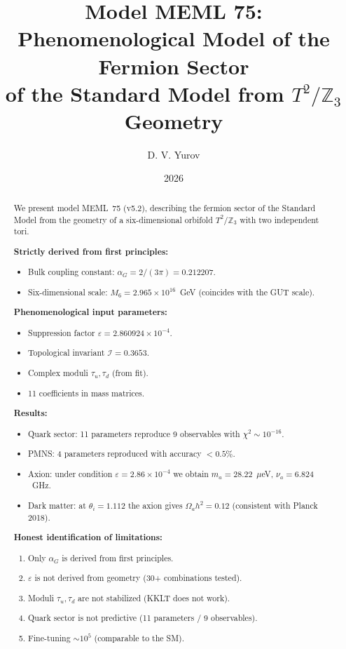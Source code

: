 \documentclass[12pt,a4paper]{article}
\title{%
    \textbf{Model MEML 75:} \\[0.3cm]
    \large Phenomenological Model of the Fermion Sector \\
    of the Standard Model from $T^2/\mathbb{Z}_3$ Geometry%
}
\author{D. V. Yurov}
\date{2026}
\numberwithin{equation}{section}
\begin{document}
\maketitle

\begin{abstract}
We present model MEML~75 (v5.2), describing the fermion sector
of the Standard Model from the geometry of a six-dimensional
orbifold $T^2/\mathbb{Z}_3$ with two independent tori.

\textbf{Strictly derived from first principles:}
\begin{itemize}[leftmargin=1.5em,itemsep=0.05em]
\item Bulk coupling constant: $\alpha_G = 2/(3\pi) = 0.212207$.
\item Six-dimensional scale: $M_6 = 2.965\times 10^{16}$~GeV
(coincides with the GUT scale).
\end{itemize}

\textbf{Phenomenological input parameters:}
\begin{itemize}[leftmargin=1.5em,itemsep=0.05em]
\item Suppression factor $\varepsilon = 2.860924\times 10^{-4}$.
\item Topological invariant $\mathcal{I} = 0.3653$.
\item Complex moduli $\tau_u, \tau_d$ (from fit).
\item 11 coefficients in mass matrices.
\end{itemize}

\textbf{Results:}
\begin{itemize}[leftmargin=1.5em,itemsep=0.05em]
\item Quark sector: 11 parameters reproduce 9 observables
with $\chi^2 \sim 10^{-16}$.
\item PMNS: 4 parameters reproduced with accuracy $<0.5\%$.
\item Axion: under condition $\varepsilon = 2.86\times 10^{-4}$
we obtain $m_a = 28.22$~$\mu$eV, $\nu_a = 6.824$~GHz.
\item Dark matter: at $\theta_i = 1.112$ the axion gives
$\Omega_a h^2 = 0.12$ (consistent with Planck 2018).
\end{itemize}

\textbf{Honest identification of limitations:}
\begin{enumerate}[leftmargin=1.5em,itemsep=0.05em]
\item Only $\alpha_G$ is derived from first principles.
\item $\varepsilon$ is not derived from geometry (30+ combinations tested).
\item Moduli $\tau_u, \tau_d$ are not stabilized (KKLT does not work).
\item Quark sector is not predictive (11 parameters / 9 observables).
\item Fine-tuning $\sim 10^5$ (comparable to the SM).
\end{enumerate}
\end{abstract}
\end{document}

